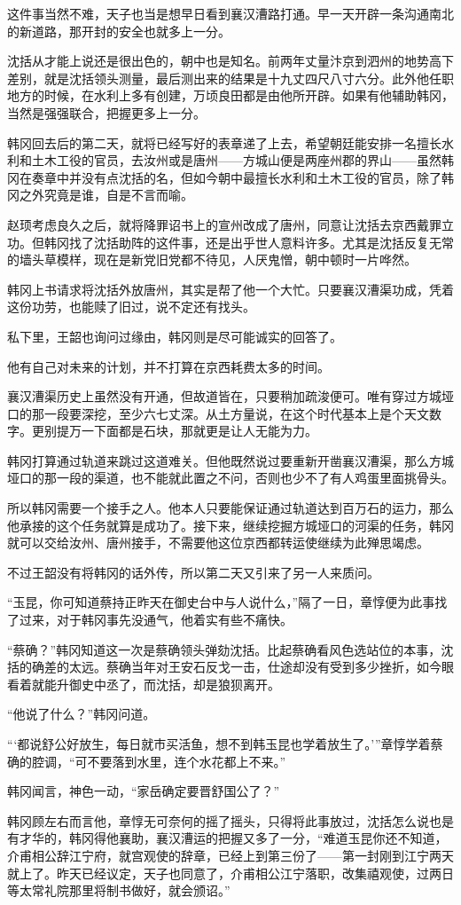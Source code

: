 这件事当然不难，天子也当是想早日看到襄汉漕路打通。早一天开辟一条沟通南北的新道路，那开封的安全也就多上一分。

沈括从才能上说还是很出色的，朝中也是知名。前两年丈量汴京到泗州的地势高下差别，就是沈括领头测量，最后测出来的结果是十九丈四尺八寸六分。此外他任职地方的时候，在水利上多有创建，万顷良田都是由他所开辟。如果有他辅助韩冈，当然是强强联合，把握更多上一分。

韩冈回去后的第二天，就将已经写好的表章递了上去，希望朝廷能安排一名擅长水利和土木工役的官员，去汝州或是唐州——方城山便是两座州郡的界山——虽然韩冈在奏章中并没有点沈括的名，但如今朝中最擅长水利和土木工役的官员，除了韩冈之外究竟是谁，自是不言而喻。

赵顼考虑良久之后，就将降罪诏书上的宣州改成了唐州，同意让沈括去京西戴罪立功。但韩冈找了沈括助阵的这件事，还是出乎世人意料许多。尤其是沈括反复无常的墙头草模样，现在是新党旧党都不待见，人厌鬼憎，朝中顿时一片哗然。

韩冈上书请求将沈括外放唐州，其实是帮了他一个大忙。只要襄汉漕渠功成，凭着这份功劳，也能赎了旧过，说不定还有找头。

私下里，王韶也询问过缘由，韩冈则是尽可能诚实的回答了。

他有自己对未来的计划，并不打算在京西耗费太多的时间。

襄汉漕渠历史上虽然没有开通，但故道皆在，只要稍加疏浚便可。唯有穿过方城垭口的那一段要深挖，至少六七丈深。从土方量说，在这个时代基本上是个天文数字。更别提万一下面都是石块，那就更是让人无能为力。

韩冈打算通过轨道来跳过这道难关。但他既然说过要重新开凿襄汉漕渠，那么方城垭口的那一段的渠道，也不能就此置之不问，否则也少不了有人鸡蛋里面挑骨头。

所以韩冈需要一个接手之人。他本人只要能保证通过轨道达到百万石的运力，那么他承接的这个任务就算是成功了。接下来，继续挖掘方城垭口的河渠的任务，韩冈就可以交给汝州、唐州接手，不需要他这位京西都转运使继续为此殚思竭虑。

不过王韶没有将韩冈的话外传，所以第二天又引来了另一人来质问。

“玉昆，你可知道蔡持正昨天在御史台中与人说什么，”隔了一日，章惇便为此事找了过来，对于韩冈事先没通气，他着实有些不痛快。

“蔡确？”韩冈知道这一次是蔡确领头弹劾沈括。比起蔡确看风色选站位的本事，沈括的确差的太远。蔡确当年对王安石反戈一击，仕途却没有受到多少挫折，如今眼看着就能升御史中丞了，而沈括，却是狼狈离开。

“他说了什么？”韩冈问道。

“‘都说舒公好放生，每日就市买活鱼，想不到韩玉昆也学着放生了。’”章惇学着蔡确的腔调，“可不要落到水里，连个水花都上不来。”

韩冈闻言，神色一动，“家岳确定要晋舒国公了？”

韩冈顾左右而言他，章惇无可奈何的摇了摇头，只得将此事放过，沈括怎么说也是有才华的，韩冈得他襄助，襄汉漕运的把握又多了一分，“难道玉昆你还不知道，介甫相公辞江宁府，就宫观使的辞章，已经上到第三份了——第一封刚到江宁两天就上了。昨天已经议定，天子也同意了，介甫相公江宁落职，改集禧观使，过两日等太常礼院那里将制书做好，就会颁诏。”

